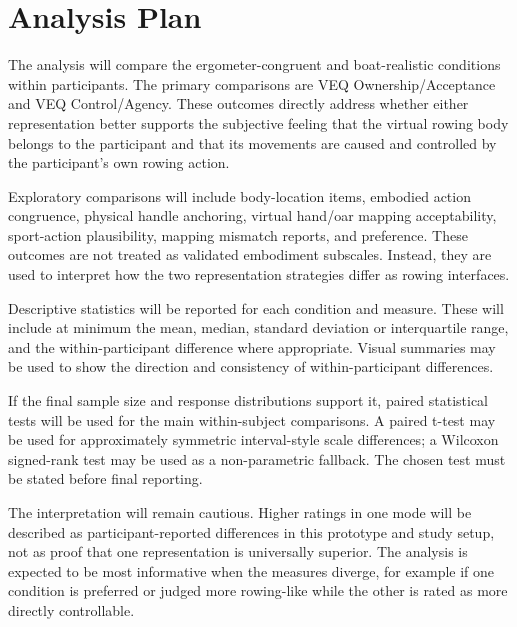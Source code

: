 \section{Analysis Plan}
\label{sec:study_design_analysis_plan}

The analysis will compare the ergometer-congruent and boat-realistic conditions within participants. The primary comparisons are VEQ Ownership/Acceptance and VEQ Control/Agency. These outcomes directly address whether either representation better supports the subjective feeling that the virtual rowing body belongs to the participant and that its movements are caused and controlled by the participant's own rowing action.

Exploratory comparisons will include body-location items, embodied action congruence, physical handle anchoring, virtual hand/oar mapping acceptability, sport-action plausibility, mapping mismatch reports, and preference. These outcomes are not treated as validated embodiment subscales. Instead, they are used to interpret how the two representation strategies differ as rowing interfaces.

Descriptive statistics will be reported for each condition and measure. These will include at minimum the mean, median, standard deviation or interquartile range, and the within-participant difference where appropriate. Visual summaries may be used to show the direction and consistency of within-participant differences.

If the final sample size and response distributions support it, paired statistical tests will be used for the main within-subject comparisons. A paired t-test may be used for approximately symmetric interval-style scale differences; a Wilcoxon signed-rank test may be used as a non-parametric fallback. The chosen test must be stated before final reporting.


The interpretation will remain cautious. Higher ratings in one mode will be described as participant-reported differences in this prototype and study setup, not as proof that one representation is universally superior. The analysis is expected to be most informative when the measures diverge, for example if one condition is preferred or judged more rowing-like while the other is rated as more directly controllable.
